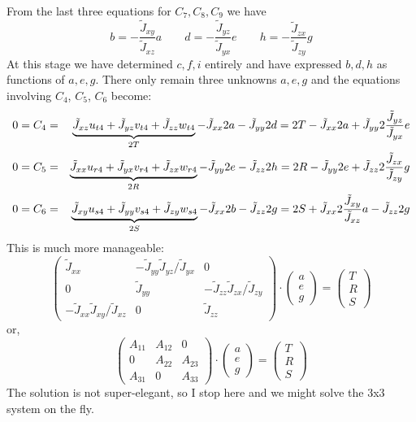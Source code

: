 From the last three equations for $C_7,C_8,C_9$ we have 
\[
b=-\frac{\tilde{J}_{xy}}{\tilde{J}_{xz}} a \quad\quad
d=-\frac{\tilde{J}_{yz}}{\tilde{J}_{yx}} e \quad\quad
h=-\frac{\tilde{J}_{zx}}{\tilde{J}_{zy}} g
\]
At this stage we have determined $c,f,i$ entirely and have expressed 
$b,d,h$ as functions of $a,e,g$. There only remain three unknowns $a,e,g$
and the equations involving $C_4$, $C_5$, $C_6$ become:
\begin{eqnarray}
0=C_4 
&=& \underbrace{\tilde{J}_{xz}u_{t4}+\tilde{J}_{yz}v_{t4}+\tilde{J}_{zz}w_{t4}}_{2T} 
-\tilde{J}_{xx} 2a - \tilde{J}_{yy} 2d  
= 2T  -\tilde{J}_{xx} 2a + \tilde{J}_{yy} 2\frac{\tilde{J}_{yz}}{\tilde{J}_{yx}} e  \nn\\ %
0=C_5 
&=& \underbrace{\tilde{J}_{xx}u_{r4}+\tilde{J}_{yx}v_{r4}+\tilde{J}_{zx}w_{r4}}_{2R} 
-\tilde{J}_{yy} 2e - \tilde{J}_{zz} 2h  
= 2R -\tilde{J}_{yy} 2e + \tilde{J}_{zz} 2\frac{\tilde{J}_{zx}}{\tilde{J}_{zy}} g  \nn\\ %
0=C_6 
&=& \underbrace{\tilde{J}_{xy}u_{s4}+\tilde{J}_{yy}v_{s4}+\tilde{J}_{zy}w_{s4}}_{2S} 
-\tilde{J}_{xx} 2b - \tilde{J}_{zz} 2g  
= 2S +\tilde{J}_{xx} 2\frac{\tilde{J}_{xy}}{\tilde{J}_{xz}} a - \tilde{J}_{zz} 2g   %
\end{eqnarray}
This is much more manageable:
\[
\left(
\begin{array}{ccc}
\tilde{J}_{xx} & - \tilde{J}_{yy} \tilde{J}_{yz}/\tilde{J}_{yx} & 0 \\
0 & \tilde{J}_{yy} & - \tilde{J}_{zz} \tilde{J}_{zx}/\tilde{J}_{zy} \\
- \tilde{J}_{xx} \tilde{J}_{xy} / \tilde{J}_{xz} & 0 & \tilde{J}_{zz}
\end{array}
\right)
\cdot
\left(
\begin{array}{c}
a \\ e \\ g
\end{array}
\right)
=
\left(
\begin{array}{c}
T \\ R \\ S
\end{array}
\right)
\]
or,
\[
\left(
\begin{array}{ccc}
A_{11} & A_{12} & 0 \\
0 & A_{22} & A_{23} \\
A_{31} & 0 & A_{33}
\end{array}
\right)
\cdot
\left(
\begin{array}{c}
a \\ e \\ g
\end{array}
\right)
=
\left(
\begin{array}{c}
T \\ R \\ S
\end{array}
\right)
\]
The solution is not super-elegant, so I stop here 
and we might solve the 3x3 system on the fly.

